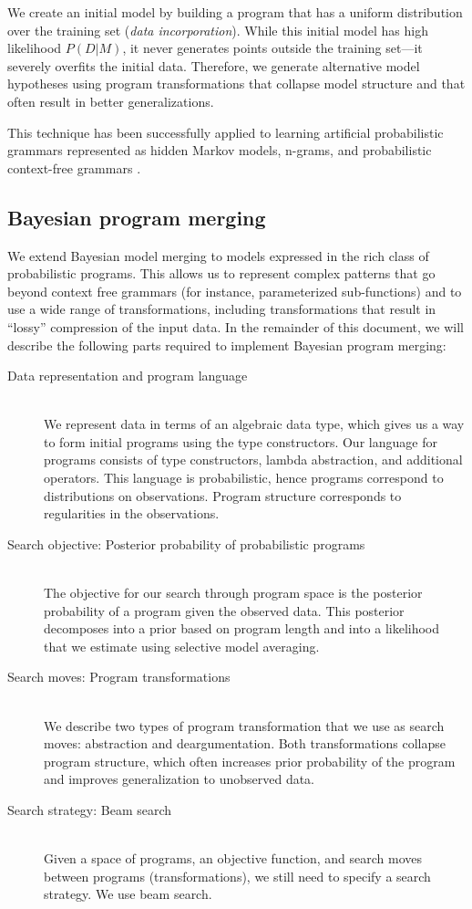 \documentclass[a4paper,10pt]{article}
\begin{document}
We create an initial model by building a program that has a uniform distribution over the training set ({\em data incorporation}).  While this initial model has high likelihood $P(D|M)$, it never generates points outside the training set---it severely overfits the initial data. Therefore, we generate alternative model hypotheses using program transformations that collapse model structure and that often result in better generalizations.

This technique has been successfully applied to learning artificial probabilistic grammars represented as hidden Markov models, n-grams, and probabilistic context-free grammars \cite{Stolcke:1994:IPG:645515.658235}.


\subsection{Bayesian program merging}

We extend Bayesian model merging to models expressed in the rich class of probabilistic programs.  This allows us to represent complex patterns that go beyond context free grammars (for instance, parameterized sub-functions) and to use a wide range of transformations, including transformations that result in ``lossy'' compression of the input data. In the remainder of this document, we will describe the following parts required to implement Bayesian program merging:

\begin{description}
\item[Data representation and program language]  \hfill \\
  We represent data in terms of an algebraic data type, which gives us a way to form initial programs using the type constructors. Our language for programs consists of type constructors, lambda abstraction, and additional operators. This language is probabilistic, hence programs correspond to distributions on observations. Program structure corresponds to regularities in the observations.
\item[Search objective: Posterior probability of probabilistic programs]  \hfill \\
  The objective for our search through program space is the posterior probability of a program given the observed data. This posterior decomposes into a prior based on program length and into a likelihood that we estimate using selective model averaging.
\item[Search moves: Program transformations]  \hfill \\
  We describe two types of program transformation that we use as search moves: abstraction and deargumentation. Both transformations collapse program structure, which often increases prior probability of the program and improves generalization to unobserved data.
  \item[Search strategy: Beam search]  \hfill \\
  Given a space of programs, an objective function, and search moves between programs (transformations), we still need to specify a search strategy. We use beam search.
\end{description}
\end{document}
